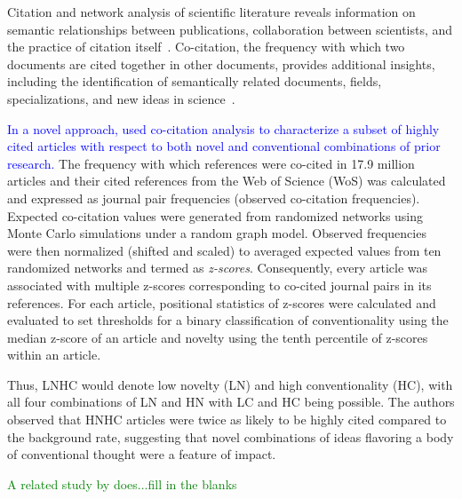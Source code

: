 \documentclass[NETN]{stjour}
\begin{document}
Citation and network analysis of  scientific literature reveals information on semantic relationships between publications, collaboration between scientists, and the practice of citation itself~\citep{garfield_citation_1955,de_solla_price_networks_1965,newman_structure_2001,Shi:2010:CHI:1816123.1816131,patience_pmid28560354,stigler_1994}. Co-citation, the frequency with which two documents are cited together in other documents, provides additional insights, including the identification of semantically related documents, fields, specializations, and new ideas in science~\citep{small_co-citation_1973, marshakova-shaikevich_co-citation_1973,boyack_co-citation_2010, 10.3389/frma.2018.00020}.  

\textcolor{blue} {In a novel approach, \cite{uzzi_atypical_2013} used co-citation analysis to characterize a subset of highly cited articles with respect to both novel and conventional combinations of prior research.} The frequency with which references were co-cited  in 17.9 million articles and their cited references from the Web of Science (WoS) was calculated and expressed as journal pair frequencies (observed co-citation frequencies). Expected co-citation values were generated from randomized networks using Monte Carlo simulations under a random graph model. Observed frequencies were then normalized (shifted and scaled) to averaged expected values from ten randomized networks and termed as \emph{z-scores}. Consequently, every article was associated with multiple z-scores corresponding to co-cited journal pairs in its references. For each article, positional statistics of z-scores were calculated and evaluated to set thresholds for a binary classification of conventionality using the median z-score of an article and novelty using the tenth percentile of z-scores within an article.

Thus, LNHC would denote low novelty (LN) and high conventionality (HC), with all four combinations of LN and HN with LC and HC being possible. The authors observed that HNHC articles were twice as likely to be highly cited compared to the background rate, suggesting that novel combinations of ideas flavoring a body of conventional thought were a feature of impact. 

\textcolor{green}{A related study by \cite{wang_bias_2017} does...fill in the blanks}
\end{document}
